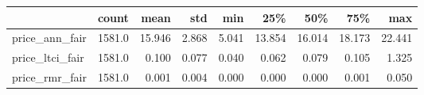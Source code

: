 \begin{tabular}{lrrrrrrrr}
\toprule
{} &   count &    mean &    std &    min &     25\% &     50\% &     75\% &     max \\
\midrule
price\_ann\_fair  &  1581.0 &  15.946 &  2.868 &  5.041 &  13.854 &  16.014 &  18.173 &  22.441 \\
price\_ltci\_fair &  1581.0 &   0.100 &  0.077 &  0.040 &   0.062 &   0.079 &   0.105 &   1.325 \\
price\_rmr\_fair  &  1581.0 &   0.001 &  0.004 &  0.000 &   0.000 &   0.000 &   0.001 &   0.050 \\
\bottomrule
\end{tabular}
